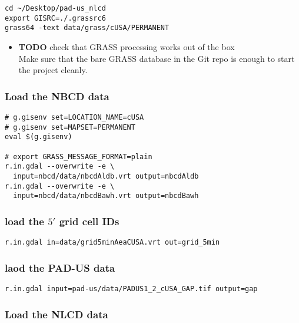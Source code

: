 \documentclass[11pt]{article}
\begin{document}
\begin{verbatim}
cd ~/Desktop/pad-us_nlcd
export GISRC=./.grassrc6
grass64 -text data/grass/cUSA/PERMANENT
\end{verbatim}
\begin{itemize}

\item \textbf{TODO} check that GRASS processing works out of the box\\
\label{sec-3-3-1-1}%
Make sure that the bare GRASS database in the Git repo is enough to
start the project cleanly.


\end{itemize} %
\subsubsection{Load the NBCD data}
\label{sec-3-3-2}



\begin{verbatim}
# g.gisenv set=LOCATION_NAME=cUSA
# g.gisenv set=MAPSET=PERMANENT
eval $(g.gisenv)

# export GRASS_MESSAGE_FORMAT=plain 
r.in.gdal --overwrite -e \
  input=nbcd/data/nbcdAldb.vrt output=nbcdAldb
r.in.gdal --overwrite -e \
  input=nbcd/data/nbcdBawh.vrt output=nbcdBawh
\end{verbatim}
\subsubsection{load the $5'$ grid cell IDs}
\label{sec-3-3-3}



\begin{verbatim}
r.in.gdal in=data/grid5minAeaCUSA.vrt out=grid_5min
\end{verbatim}
\subsubsection{laod the PAD-US data}
\label{sec-3-3-4}



\begin{verbatim}
r.in.gdal input=pad-us/data/PADUS1_2_cUSA_GAP.tif output=gap
\end{verbatim}
\subsubsection{Load the NLCD data}
\label{sec-3-3-5}
\end{document}
